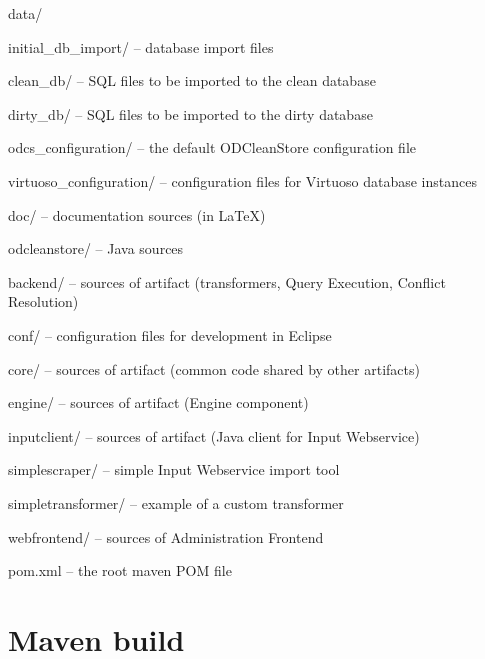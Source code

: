 \begin{dirlist}
	\item[data/] \mbox{}
		\begin{dirlist}
			\item[initial\_db\_import/] -- database import files
				\begin{dirlist}
					\item[clean\_db/] -- SQL files to be imported to the clean database
					\item[dirty\_db/] -- SQL files to be imported to the dirty database
				\end{dirlist}
			\item[odcs\_configuration/] -- the default ODCleanStore configuration file
			\item[virtuoso\_configuration/] -- configuration files for Virtuoso database instances
		\end{dirlist}
	\item[doc/] -- documentation sources (in \LaTeX)
	\item[odcleanstore/] -- Java sources
		\begin{dirlist}
			\item[backend/] -- sources of  artifact (transformers, Query Execution, Conflict Resolution)
			\item[conf/] -- configuration files for development in Eclipse
			\item[core/] -- sources of  artifact (common code shared by other artifacts)
			\item[engine/]  -- sources of  artifact (Engine component)
			\item[inputclient/]  -- sources of  artifact (Java client for Input Webservice)
			\item[simplescraper/]  -- simple Input Webservice import tool
			\item[simpletransformer/]  -- example of a custom transformer
			\item[webfrontend/]  -- sources of Administration Frontend
			\item[pom.xml] -- the root maven POM file
		\end{dirlist}
\end{dirlist}


\section{Maven build}

